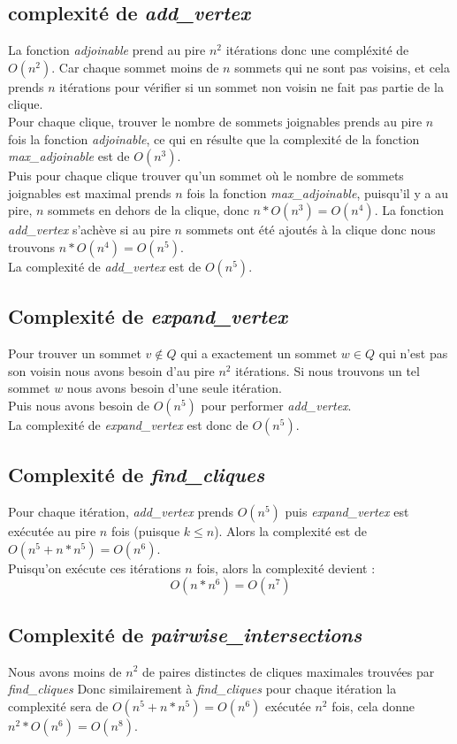 \documentclass{article}
\begin{document}
\subsection{complexité de \textit{add\_vertex}}
La fonction \textit{adjoinable} prend au pire $n^2$ itérations donc une compléxité de $O(n^2)$.
Car chaque sommet moins de $n$ sommets qui ne sont pas voisins, et cela prends $n$ itérations pour
vérifier si un sommet non voisin ne fait pas partie de la clique.\\
Pour chaque clique, trouver le nombre de sommets joignables prends au pire $n$ fois la fonction
\textit{adjoinable}, ce qui en résulte que la complexité de la fonction \textit{max\_adjoinable} est
de $O(n^3)$.\\
Puis pour chaque clique trouver qu'un sommet où le nombre de sommets joignables est maximal prends
$n$ fois la fonction \textit{max\_adjoinable}, puisqu'il y a au pire, $n$ sommets en dehors de la
clique, donc $n*O(n^3)=O(n^4)$. La fonction \textit{add\_vertex} s'achève si au pire $n$ sommets
ont été ajoutés à la clique donc nous trouvons $n*O(n^4)=O(n^5)$.\\
La complexité de \textit{add\_vertex} est de $O(n^5)$.
\subsection{Complexité de \textit{expand\_vertex}}
Pour trouver un sommet $v \notin Q$ qui a exactement un sommet $w \in Q$ qui n'est pas son voisin
nous avons besoin d'au pire $n^2$ itérations. Si nous trouvons un tel sommet $w$ nous avons besoin
d'une seule itération.\\ Puis nous avons besoin de $O(n^5)$ pour performer \textit{add\_vertex}.\\
La complexité de \textit{expand\_vertex} est donc de $O(n^5)$.
\subsection{Complexité de \textit{find\_cliques}}
Pour chaque itération, \textit{add\_vertex} prends $O(n^5)$ puis \textit{expand\_vertex} est exécutée
au pire $n$ fois (puisque $k \leq n$). Alors la complexité est de $O(n^5+n*n^5)=O(n^6)$. \\
Puisqu'on exécute ces itérations $n$ fois, alors la complexité devient :
\begin{displaymath}
  O(n*n^6)=O(n^7)
\end{displaymath}
\subsection{Complexité de \textit{pairwise\_intersections}}
Nous avons moins de $n^2$ de paires distinctes de cliques maximales trouvées par \textit{find\_cliques}
Donc similairement à \textit{find\_cliques} pour chaque itération la complexité sera de $O(n^5+n*n^5)=O(n^6)$
exécutée $n^2$ fois, cela donne $n^2*O(n^6)=O(n^8)$.
\end{document}
